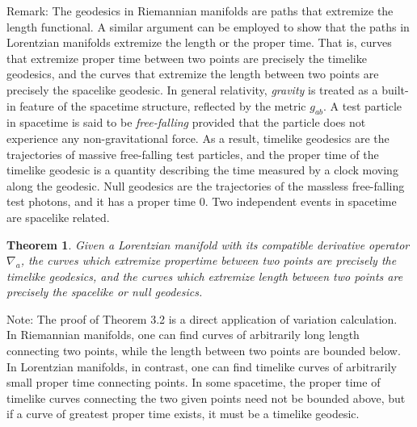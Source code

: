 \documentclass[11pt, onesided]{book}
\theoremstyle{break}
\theoremstyle{break}
\newtheorem{thm}{Theorem}[section]
\newcommand{\note}{\color{red}Note: \color{black}}
\newcommand{\remark}{\color{blue}Remark: \color{black}}
\begin{document}
\remark The geodesics in Riemannian manifolds are paths that extremize the length functional. A similar argument can be employed to show that the paths in Lorentzian manifolds extremize the length or the proper time. That is, curves that extremize proper time between two points are precisely the timelike geodesics, and the curves that extremize the length between two points are precisely the spacelike geodesic. In general relativity, \textit{gravity} is treated as a built-in feature of the spacetime structure, reflected by the metric $g_{ab}$. A test particle in spacetime is said to be \textit{free-falling} provided that the particle does not experience any non-gravitational force. As a result, timelike geodesics are the trajectories of massive free-falling test particles, and the proper time of the timelike geodesic is a quantity describing the time measured by a clock moving along the geodesic. Null geodesics are the trajectories of the massless free-falling test photons, and it has a proper time $0$. Two independent events in spacetime are spacelike related. \\

\begin{thm}
Given a Lorentzian manifold with its compatible derivative operator $\nabla_a$, the curves which extremize propertime between two points are precisely the timelike geodesics, and the curves which extremize length between two points are precisely the spacelike or null geodesics. 
\end{thm}
\note The proof of Theorem 3.2 is a direct application of variation calculation. \\

In Riemannian manifolds, one can find curves of arbitrarily long length connecting two points, while the length between two points are bounded below. In Lorentzian manifolds, in contrast, one can find timelike curves of arbitrarily small proper time connecting points. In some spacetime, the proper time of timelike curves connecting the two given points need not be bounded above, but if a curve of greatest proper time exists, it must be a timelike geodesic. \\
\end{document}

